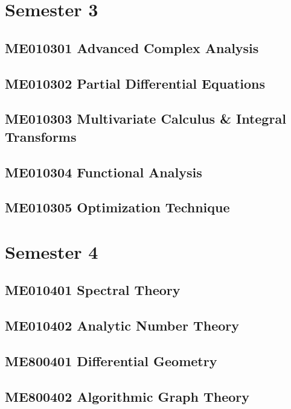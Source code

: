 \documentclass[a4paper,10pt,openany]{book}
\begin{document}
\part{Semester 3}
\chapter{ME010301 Advanced Complex Analysis}

\chapter{ME010302 Partial Differential Equations}

\chapter{ME010303 Multivariate Calculus \& Integral Transforms}

\chapter{ME010304 Functional Analysis}

\chapter{ME010305 Optimization Technique}


\part{Semester 4}
\chapter{ME010401 Spectral Theory}

\chapter{ME010402 Analytic Number Theory}


\chapter{ME800401 Differential Geometry}

\chapter{ME800402 Algorithmic Graph Theory}

\end{document}
